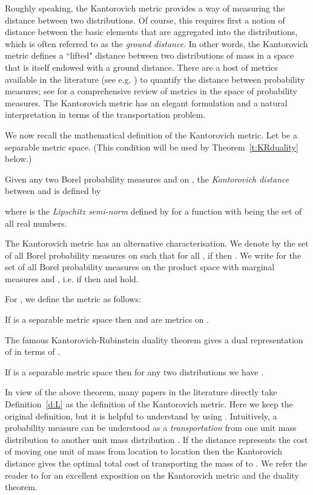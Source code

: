 \documentclass{article}
\def\squareforqed{\hbox{\rlap{}}}
\def\qed{\ifmmode\squareforqed\else{\unskip\nobreak\hfil
\penalty50\hskip1em\null\nobreak\hfil\squareforqed
\parfillskip=0pt\finalhyphendemerits=0\endgraf}\fi}
\begin{document}
Roughly speaking,  the Kantorovich metric provides a way of
measuring the distance between two distributions. Of course, this
requires first a notion of distance between the basic elements that
are aggregated into the distributions, which is often referred to as
the \emph{ground distance}. In other words, the Kantorovich metric
defines a ``lifted" distance between two distributions of mass in a
space that is itself endowed with a ground distance. There are a
host of metrics available in the literature (see e.g. \cite{GS02})
to quantify the distance between probability measures; see
\cite{Rac91} for a comprehensive review of metrics in the space of
probability measures. The Kantorovich metric has an elegant
formulation and a natural interpretation in terms of the
transportation problem.

We now recall the mathematical definition of the Kantorovich metric.
Let  be a separable metric space. (This condition will be
used by Theorem~\ref{t:KRduality} below.)
\begin{definition}\label{d:K} Given any two Borel probability measures  and  on , the \emph{Kantorovich distance} between
 and  is defined by

where  is the \emph{Lipschitz semi-norm} defined by
 for a function
 with  being the set of all real
numbers.
\end{definition}

The Kantorovich metric has an alternative characterisation. We
denote by  the set of all Borel probability measures on 
such that for all , if  then . We write  for the set of
all Borel probability measures on the product space  with
marginal measures  and , i.e. if  then  and
 hold.
\begin{definition}\label{d:L}
For , we define the metric  as follows:

\end{definition}


\begin{lemma}
If  is a separable metric space then  and  are metrics
on . \hfill\qed
\end{lemma}

The famous Kantorovich-Rubinstein duality theorem gives a dual
representation of  in terms of  .
\begin{theorem}
\label{t:KRduality} If 
is a separable metric space then for any two distributions
 we have
. \hfill\qed
\end{theorem}

In view of the above theorem, many papers in the literature directly
take Definition~\ref{d:L} as the definition of the Kantorovich
metric. Here we keep the original definition, but it is helpful to
understand  by using . Intuitively, a probability measure
 can be understood as a
\emph{transportation} from one unit mass distribution  to
another unit mass distribution . If the distance 
represents the cost of moving one unit of mass from location  to
location  then the Kantorovich distance gives the optimal total
cost of transporting the mass of  to . We refer the
reader to \cite{Vil03} for an excellent exposition on the
Kantorovich metric and the duality theorem.
\end{document}

